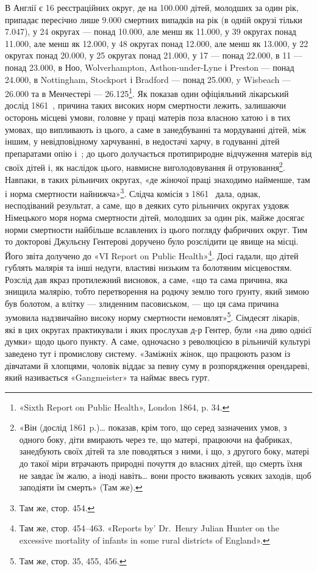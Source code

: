 \parcont{}  %
В Англії є 16 реєстраційних округ, де на \num{100.000} дітей, молодших
за один рік, припадає пересічно лише \num{9.000} смертних випадків
на рік (в одній окрузі тільки \num{7.047}), у 24 округах — понад \num{10.000},
але менш як \num{11.000}, у 39 округах понад \num{11.000}, але менш як \num{12.000},
у 48 округах понад \num{12.000}, але менш як \num{13.000}, у 22 округах
понад \num{20.000}, у 25 округах понад \num{21.000}, у 17 — понад \num{22.000},
в 11 — понад \num{23.000}, в Ноо, Wolverhampton, Asthon-under-Lyne
і Preston — понад \num{24.000}, в Nottingham, Stockport і Bradford —
понад \num{25.000}, y Wisbeach — \num{26.000} та в Менчестері — \num{26.125}\footnote{
«Sixth Report on Public Health», London 1864, p. 34.
}.
Як показав один офіціяльний лікарський дослід 1861~, причина
таких високих норм смертности лежить, залишаючи осторонь
місцеві умови, головне у праці матерів поза власною хатою і в
тих умовах, що випливають із цього, а саме в занедбуванні та
мордуванні дітей, між іншим, у невідповідному харчуванні, в
недостачі харчу, в годуванні дітей препаратами опію і~;
до цього долучається протиприродне відчуження матерів від
своїх дітей і, як наслідок цього, навмисне виголодовування й
отруювання\footnote{
«Він (дослід 1861 p.)\dots{} показав, крім того, що серед зазначених
умов, з одного боку, діти вмирають через те, що матері, працюючи на фабриках,
занедбують своїх дітей та зле поводяться з ними, і що, з другого
боку, матері до такої міри втрачають природні почуття до власних
дітей, що смерть їхня не завдає їм жалю, а іноді навіть\dots{} вони просто вживають
усяких заходів, щоб заподіяти їм смерть» (Там же).
}. Навпаки, в таких рільничих округах, «де жіночої
праці знаходимо найменше, там і норма смертности найнижча»\footnote{
Там же, стор. 454.
}.
Слідча комісія з 1861~ дала, однак, несподіваний результат,
а саме, що в деяких суто рільничих округах уздовж Німецького
моря норма смертности дітей, молодших за один рік, майже
досягає норми смертности найбільше вславлених із цього погляду
фабричних округ. Тим то докторові Джульєну Гентерові доручено
було розслідити це явище на місці. Його звіта долучено до
«VI Report on Public Health»\footnote{
Там же, стор. 454--463. «Reports by' Dr.~Henry Julian Hunter
on the excessive mortality of infants in some rural districts of England».
}. Досі гадали, що дітей гублять малярія
та інші недуги, властиві низьким та болотяним місцевостям.
Розслід дав якраз протилежний висновок, а саме, «що та сама
причина, яка знищила малярію, тобто перетворення на родючу
землю того ґрунту, який зимою був болотом, а влітку — злиденним
пасовиськом, — що ця сама причина зумовила надзвичайно
високу норму смертности немовлят»\footnote{
Там же, стор. 35, 455, 456.
}. Сімдесят лікарів, які
в цих округах практикували і яких прослухав д-р Гентер,
були «на диво однієї думки» щодо цього пункту. А саме, одночасно
з революцією в рільничій культурі заведено тут і промислову
систему. «Заміжніх жінок, що працюють разом із дівчатами й
хлопцями, чоловік віддає за певну суму в розпорядження орендареві,
який називається «Gangmeister» та наймає ввесь гурт.
\parbreak{}  %
